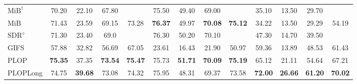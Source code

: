 \begin{table*}[t]
\begin{adjustbox}{max width=\textwidth}
\begin{tabular}{@{}l|cccc||cccc||cccc@{}}
            $\text{MiB}^\dagger$ \scriptsize{\citep{cermelli2020modelingthebackground}} & 70.20                                       & 22.10                                       & 67.80                                       &                & 75.50             & 49.40          & 69.00             &                & 35.10             & 13.50             & 29.70             &                \\
            MiB \scriptsize{\citep{cermelli2020modelingthebackground}}                  & 71.43                                       & 23.59                                       & 69.15                                       & 73.28          & \textbf{76.37}    & 49.97          & \textbf{70.08}    & \textbf{75.12} & 34.22             & 13.50             & 29.29             & 54.19          \\
            $\text{SDR}^\diamond$ \scriptsize{\citep{michieli2021sdr}}                  & 71.30                                       & 23.40                                       & 69.0                                        &                & 76.30             & 50.20          & 70.10             &                & 47.30             & 14.70             & 39.50             &                \\
            GIFS \scriptsize{\citep{cermelli2020fewshotcontinualsegm}}                  & 57.88                                       & 32.82                                       & 56.69                                       & 67.05          & 23.61             & 16.43          & 21.90             & 50.97          & 59.36             & 13.89             & 48.53             & 61.43          \\
            \hdashline
            PLOP                                                                        & \textbf{75.35}                              & 37.35                                       & \textbf{73.54}                              & \textbf{75.47} & 75.73             & \textbf{51.71} & \textbf{70.09}    & \textbf{75.19} & 65.12             & 21.11             & 54.64             & 67.21          \\
            PLOPLong                                                                    & 74.75                                       & \textbf{39.68}                              & 73.08                                       & 74.32          & 75.95             & 48.31          & 69.37             & 73.58          & \textbf{72.00}    & \textbf{26.66}    & \textbf{61.20}    & \textbf{70.02} \\

\end{tabular}
\end{adjustbox}
\end{table*}

